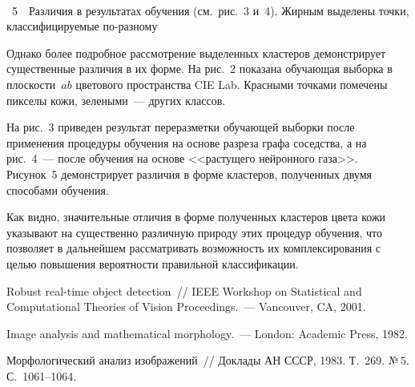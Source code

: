       
      \begin{multicols}{2}
      


\begin{center} %
\mbox{%
 \epsfxsize=79mm
}
\end{center}
{{\figurename~5}\ \ \small{Различия в результатах обучения (см.\ рис.~3 и~4). Жирным выделены точки, классифицируемые 
по-разному}}
\vspace*{12pt}

\addtocounter{figure}{1}


      
Одна\-ко более подробное рассмотрение выделенных  клас\-теров демонстрирует 
существенные различия в их форме. На рис.~2 показана обучающая выборка в плоскости~$ab$ 
цветового пространства CIE Lab. Красными точками помечены пикселы кожи, зелеными~--- 
других классов.
      

На рис.~3 приведен результат переразметки обуча\-ющей выборки после применения процедуры 
обучения на основе разреза графа соседства, а на рис.~4~--- после обучения на основе 
<<растущего нейронного газа>>. Рисунок~5 демонстрирует различия в форме кластеров, 
полученных двумя способами обучения.


Как видно, значительные отличия в форме полученных кластеров цвета кожи указывают на 
существенно различную природу этих процедур обуче\-ния, что позволяет в дальнейшем 
рассматривать возможность их комплексирования с целью повышения вероятности правильной 
классификации.

{\small\frenchspacing
{%
\begin{thebibliography}{99}

Robust real-time object detection~//  IEEE Workshop on Statistical and Computational Theories of 
Vision Proceedings.~--- Vancouver, CA,  2001.


Image analysis and mathematical morphology.~--- London: Academic Press, 1982. 

Морфологический анализ изображений~// Доклады АН СССР, 1983. Т.~269. №\,5. 
С.~1061--1064.


\end{thebibliography}}}
\end{multicols}
